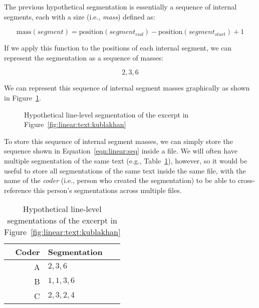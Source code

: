\documentclass{article}
\begin{document}
The previous hypothetical segmentation is essentially a sequence of internal
segments, each with a size (i.e., \emph{mass}) defined as:

\begin{equation}\label{eqn:linear:pos}
\text{mass}(segment) = \text{position}(segment_{end}) - \text{position}(segment_{start}) + 1
\end{equation}
\vspace{0.00em}

If we apply this function to the positions of each internal segment, we can
represent the segmentation as a sequence of masses:

\begin{equation}\label{eqn:linear:seq}
2,3,6
\end{equation}
\vspace{0.00em}

We can represent this sequence of internal segment masses graphically as shown
in Figure~\ref{fig:linear:segmentation:graphic:kublakhan}.

\begin{figure}[h]
\centering
{}
\caption{Hypothetical line-level segmentation of the excerpt in Figure~\ref{fig:linear:text:kublakhan}}
\label{fig:linear:segmentation:graphic:kublakhan}
\end{figure}

To store this sequence of internal segment masses, we can simply store the
sequence shown in Equation~\ref{eqn:linear:seq} inside a file.  We will often
have multiple segmentation of the same text (e.g.,
Table~\ref{table:linear:multiple_segmentations:kublakhan}), however, so it would
be useful to store all segmentations of the same text inside the same file, with
the name of the \emph{coder} (i.e., person who created the segmentation) to be
able to cross-reference this person's segmentations across multiple files.

\begin{table}[h]
\centering
\begin{tabular}{ r l }
\textbf{Coder}  & \textbf{Segmentation} \\ \hline \hline
A & $2,3,6$ \\
B & $1,1,3,6$ \\
C & $2,3,2,4$ \\
\end{tabular}
\caption{Hypothetical line-level segmentations of the excerpt in Figure~\ref{fig:linear:text:kublakhan}}
\label{table:linear:multiple_segmentations:kublakhan}
\end{table}
\end{document}
